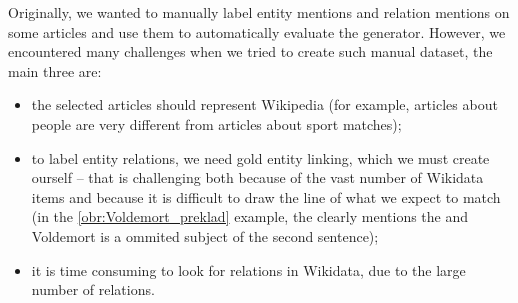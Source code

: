 Originally, we wanted to manually label entity mentions and relation mentions on some articles and use them to automatically evaluate the generator. However, we encountered many challenges when we tried to create such manual dataset, the main three are:
\begin{itemize}
\item the selected articles should represent Wikipedia (for example, articles about people are very different from articles about sport matches);
\item to label entity relations, we need gold entity linking, which we must create ourself -- that is challenging both because of the vast number of Wikidata items and because it is difficult to draw the line of what we expect to match (in the \autoref{obr:Voldemort_preklad} example, the  clearly mentions the  and Voldemort is a ommited subject of the second sentence);
\item it is time consuming to look for relations in Wikidata, due to the large number of relations.


\end{itemize}




